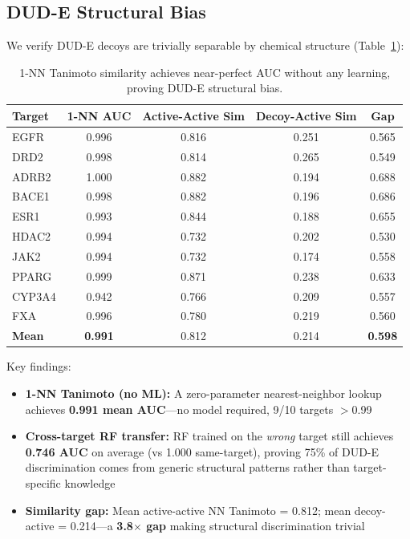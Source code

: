\documentclass{article}
\begin{document}
\subsection{DUD-E Structural Bias}

We verify DUD-E decoys are trivially separable by chemical structure (Table~\ref{tab:dude_bias}):

\begin{table}[h]
\caption{1-NN Tanimoto similarity achieves near-perfect AUC without any learning, proving DUD-E structural bias.}
\label{tab:dude_bias}
\centering
\small
\begin{tabular}{@{}lcccc@{}}
\toprule
Target & 1-NN AUC & Active-Active Sim & Decoy-Active Sim & Gap \\
\midrule
EGFR & 0.996 & 0.816 & 0.251 & 0.565 \\
DRD2 & 0.998 & 0.814 & 0.265 & 0.549 \\
ADRB2 & 1.000 & 0.882 & 0.194 & 0.688 \\
BACE1 & 0.998 & 0.882 & 0.196 & 0.686 \\
ESR1 & 0.993 & 0.844 & 0.188 & 0.655 \\
HDAC2 & 0.994 & 0.732 & 0.202 & 0.530 \\
JAK2 & 0.994 & 0.732 & 0.174 & 0.558 \\
PPARG & 0.999 & 0.871 & 0.238 & 0.633 \\
CYP3A4 & 0.942 & 0.766 & 0.209 & 0.557 \\
FXA & 0.996 & 0.780 & 0.219 & 0.560 \\
\midrule
\textbf{Mean} & \textbf{0.991} & 0.812 & 0.214 & \textbf{0.598} \\
\bottomrule
\end{tabular}
\end{table}

Key findings:
\begin{itemize}[noitemsep,topsep=0pt]
\item \textbf{1-NN Tanimoto (no ML):} A zero-parameter nearest-neighbor lookup achieves \textbf{0.991 mean AUC}---no model required, 9/10 targets $>$0.99
\item \textbf{Cross-target RF transfer:} RF trained on the \textit{wrong} target still achieves \textbf{0.746 AUC} on average (vs 1.000 same-target), proving 75\% of DUD-E discrimination comes from generic structural patterns rather than target-specific knowledge
\item \textbf{Similarity gap:} Mean active-active NN Tanimoto = 0.812; mean decoy-active = 0.214---a \textbf{3.8$\times$ gap} making structural discrimination trivial
\end{itemize}
\end{document}
